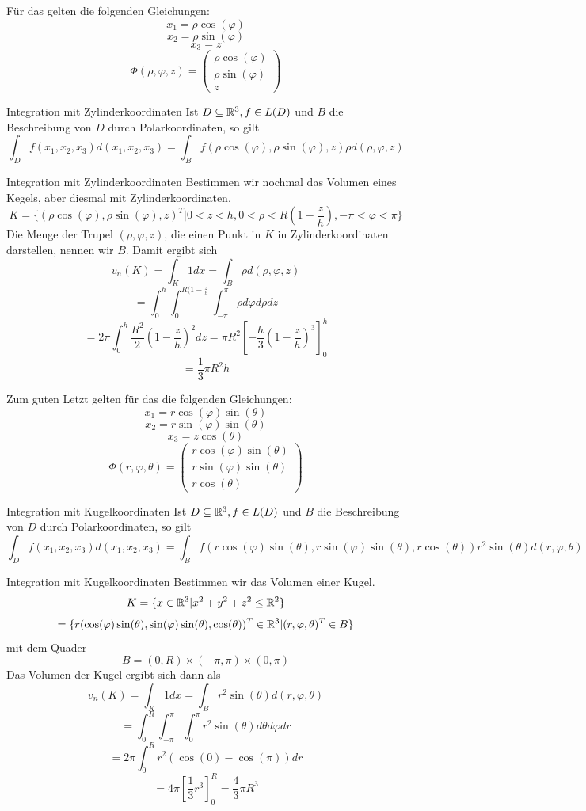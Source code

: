 Für das  gelten die folgenden Gleichungen:
$$x_1=\rho\cos(\varphi)$$
$$x_2=\rho \sin(\varphi)$$
$$x_3=z$$
$$\Phi(\rho, \varphi, z)=\begin{pmatrix}
    \rho \cos(\varphi) \\
    \rho \sin(\varphi) \\
    z
\end{pmatrix}$$
\begin{Def}{Integration mit Zylinderkoordinaten}
Ist $D\subseteq \mathbb{R}^3, f\in L(D)$ und $B$ die Beschreibung von $D$ durch Polarkoordinaten, so gilt
$$\int_D f(x_1,x_2,x_3)d(x_1,x_2,x_3) = \int_B f(\rho\cos(\varphi), \rho\sin(\varphi),z)\rho d(\rho, \varphi, z)$$
\end{Def}
\begin{Beispiel}{Integration mit Zylinderkoordinaten}
Bestimmen wir nochmal das Volumen eines Kegels, aber diesmal mit Zylinderkoordinaten. $$K=\{(\rho \cos(\varphi), \rho \sin(\varphi), z)^T| 0<z<h, 0<\rho<R(1-\frac{z}{h}), -\pi <\varphi < \pi\}$$ Die Menge der Trupel $(\rho, \varphi, z)$, die einen Punkt in $K$ in Zylinderkoordinaten darstellen, nennen wir $B$. Damit ergibt sich
$$v_n(K)=\int_K 1 dx=\int_B \rho d(\rho, \varphi, z)$$
$$=\int_0^h\int_0^{R(1-\frac{z}{h}}\int_{-\pi}^{\pi} \rho d\varphi d\rho dz$$
$$=2\pi \int_0^h \frac{R^2}{2}(1-\frac{z}{h})^2dz=\pi R^2 [-\frac{h}{3}(1-\frac{z}{h})^3]_0^h$$
$$=\frac{1}{3}\pi R^2 h$$
\end{Beispiel}
Zum guten Letzt gelten für das  die folgenden Gleichungen:
$$x_1=r\cos(\varphi)\sin(\theta)$$
$$x_2=r \sin(\varphi)\sin(\theta)$$
$$x_3=z\cos(\theta)$$
$$\Phi(r, \varphi, \theta)=\begin{pmatrix}
    r \cos(\varphi)\sin(\theta) \\
    r \sin(\varphi)\sin(\theta) \\
    r \cos(\theta)
\end{pmatrix}$$
\begin{Def}{Integration mit Kugelkoordinaten}
Ist $D\subseteq \mathbb{R}^3, f\in L(D)$ und $B$ die Beschreibung von $D$ durch Polarkoordinaten, so gilt
$$\int_D f(x_1,x_2,x_3)d(x_1,x_2,x_3) = \int_B f(r \cos(\varphi)\sin(\theta), r \sin(\varphi)\sin(\theta),r \cos(\theta))r^2\sin(\theta) d(r, \varphi, \theta)$$
\end{Def}
\begin{Beispiel}{Integration mit Kugelkoordinaten}
Bestimmen wir das Volumen einer Kugel.
$$K=\{x\in\mathbb{R}^3 | x^2+y^2+z^2\leq \mathbb{R}^2\}$$
$$=\{r (\cos(\varphi)\sin(\theta), \sin(\varphi)\sin(\theta),\cos(\theta))^T\in\mathbb{R}^3 | (r,\varphi, \theta)^T\in B \}$$
mit dem Quader
$$B=(0,R)\times(-\pi, \pi)\times (0, \pi)$$
Das Volumen der Kugel ergibt sich dann als
$$v_n(K)=\int_K 1 dx = \int_B r^2\sin(\theta) d(r,\varphi, \theta)$$
$$=\int_0^R\int_{-\pi}^\pi \int_0^\pi r^2 \sin(\theta) d\theta d\varphi dr$$
$$=2\pi \int_0^R r^2(\cos(0)-\cos(\pi))dr$$
$$=4\pi [\frac{1}{3}r^3]_0^R = \frac{4}{3}\pi R^3$$
\end{Beispiel}